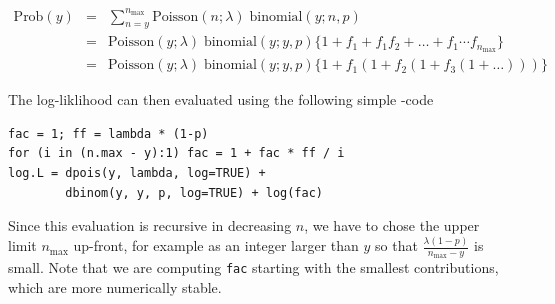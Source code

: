 \documentclass[article]{jss}
\begin{document}
\begin{eqnarray}
    \text{Prob}(y) &=& \sum_{n = y}^{n_{\text{max}}}
                       \text{Poisson}(n ; \lambda)\;
                      \text{binomial}(y;  n, p) \nonumber\\
                   &=& \text{Poisson}(y; \lambda)\; \text{binomial}(y; y, p)
                       \Big\{ 1 + f_1 + f_1f_2 +
                    \ldots
                      +f_1\cdots f_{n_\text{max}}
                       \Big\} \nonumber\\
                   &=& \text{Poisson}(y; \lambda)\; \text{binomial}(y; y, p)
                       \Big\{ 1 + f_1(1+f_2(1+f_3(1+ \dots)))\Big\}\nonumber
\end{eqnarray}

The log-liklihood can then evaluated using the following simple -code

\begin{verbatim}
fac = 1; ff = lambda * (1-p)
for (i in (n.max - y):1) fac = 1 + fac * ff / i
log.L = dpois(y, lambda, log=TRUE) +
        dbinom(y, y, p, log=TRUE) + log(fac)
\end{verbatim}

Since this evaluation is recursive in decreasing $n$, we have to chose the upper limit $n_\text{max}$ up-front, for example as an integer larger than $y$ so that $\frac{\lambda (1-p)}{n_\text{max}-y}$ is
small. Note that we are computing \texttt{fac} starting with the smallest contributions, which are more numerically stable.
\end{document}
